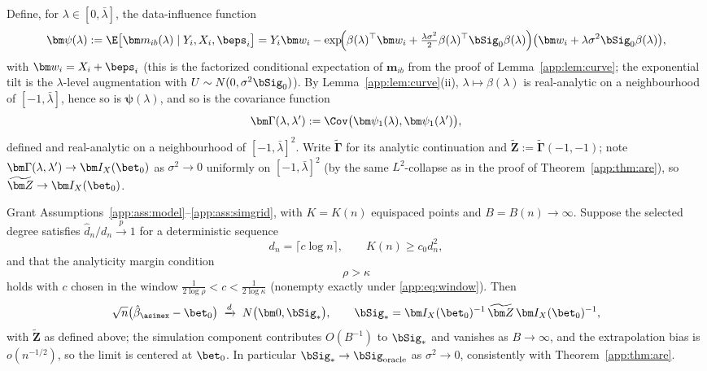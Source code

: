 Define, for $\lambda\in[0,\bar\lambda]$, the data-influence function
\[
  \bm\psi(\lambda)
  :=\E\bigl[\bm m_{ib}(\lambda)\mid Y_i,X_i,\beps_i\bigr]
  =Y_i\bm w_i
   -\exp\!\Bigl(\beta(\lambda)^\top\bm w_i
   +\tfrac{\lambda\sigma^2}{2}\beta(\lambda)^\top\bSig_0\beta(\lambda)\Bigr)
   \bigl(\bm w_i+\lambda\sigma^2\bSig_0\beta(\lambda)\bigr),
\]
with $\bm w_i=X_i+\beps_i$ (this is the factorized conditional expectation
of $\bm m_{ib}$ from the proof of Lemma~\ref{app:lem:curve}; the exponential
tilt is the $\lambda$-level augmentation with
$U\sim N(0,\sigma^2\bSig_0)$). By Lemma~\ref{app:lem:curve}(ii),
$\lambda\mapsto\beta(\lambda)$ is real-analytic on a neighbourhood of
$[-1,\bar\lambda]$, hence so is $\bm\psi(\lambda)$, and so is the
covariance function
\[
  \bm\Gamma(\lambda,\lambda')
  :=\Cov\bigl(\bm\psi_1(\lambda),\bm\psi_1(\lambda')\bigr),
\]
defined and real-analytic on a neighbourhood of
$[-1,\bar\lambda]^2$. Write $\widetilde{\bm\Gamma}$ for its analytic
continuation and $\widetilde{\bm Z}:=\widetilde{\bm\Gamma}( -1,-1)$;
note $\bm\Gamma(\lambda,\lambda')\to\bm I_X(\bet_0)$ as
$\sigma^2\to0$ uniformly on $[-1,\bar\lambda]^2$ (by the same
$L^2$-collapse as in the proof of Theorem~\ref{app:thm:are}), so
$\widetilde{\bm Z}\to\bm I_X(\bet_0)$.

\begin{theorem}\label{app:thm:grow}
Grant Assumptions~\ref{app:ass:model}--\ref{app:ass:simgrid}, with $K=K(n)$
equispaced points and $B=B(n)\to\infty$. Suppose the selected degree
satisfies $\hat d_n/d_n\xrightarrow{p}1$ for a deterministic sequence
\[
  d_n=\lceil c\log n\rceil,
  \qquad K(n)\ge c_0d_n^2,
\]
and that the analyticity margin condition
\begin{equation}\label{app:eq:window}
  \rho>\kappa
\end{equation}
holds with $c$ chosen in the window
$\tfrac{1}{2\log\rho}<c<\tfrac{1}{2\log\kappa}$ (nonempty exactly under
\eqref{app:eq:window}). Then
\[
  \sqrt n\bigl(\hat\beta_{\asimex}-\bet_0\bigr)
  \;\xrightarrow{d}\;N\bigl(\bm 0,\bSig_*\bigr),
  \qquad
  \bSig_*=\bm I_X(\bet_0)^{-1}\,\widetilde{\bm Z}\,
           \bm I_X(\bet_0)^{-1},
\]
with $\widetilde{\bm Z}$ as defined above; the simulation component
contributes $O(B^{-1})$ to $\bSig_*$ and vanishes as $B\to\infty$, and
the extrapolation bias is $o(n^{-1/2})$, so the limit is centered at
$\bet_0$. In particular $\bSig_*\to\bSig_{\mathrm{oracle}}$ as
$\sigma^2\to0$, consistently with Theorem~\ref{app:thm:are}.
\end{theorem}

